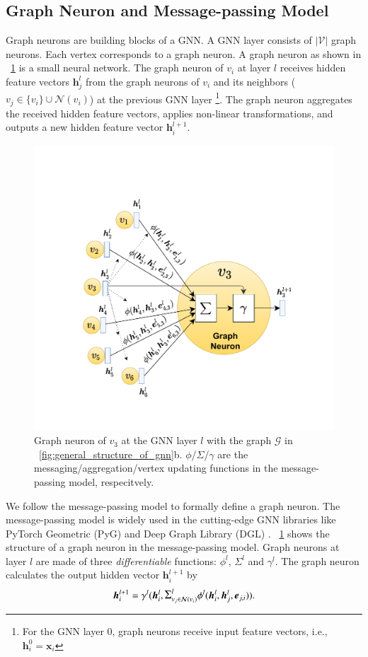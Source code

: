 \subsection{Graph Neuron and Message-passing Model}

Graph neurons are building blocks of a GNN.
A GNN layer consists of $|\mathcal{V}|$ graph neurons.
Each vertex corresponds to a graph neuron.
A graph neuron as shown in \figurename~\ref{fig:graph_neuron_structure} is a small neural network.
The graph neuron of $v_i$ at layer $l$ receives hidden feature vectors $\boldsymbol{h}^l_j$ from the graph neurons of $v_i$ and its neighbors ($v_j \in \{v_i\} \cup \mathcal{N}(v_i)$) at the previous GNN layer \footnote{For the GNN layer 0, graph neurons receive input feature vectors, i.e., $\boldsymbol{h}^0_i=\boldsymbol{x}_i$}.
The graph neuron aggregates the received hidden feature vectors, applies non-linear transformations, and outputs a new hidden feature vector $\boldsymbol{h}_i^{l+1}$.

\begin{figure}
    \centering
    \includegraphics[width=0.5\columnwidth]{figs/illustration/GNN_Unit.pdf}
    \caption{Graph neuron of $v_3$ at the GNN layer $l$ with the graph $\mathcal{G}$ in \figurename~\ref{fig:general_structure_of_gnn}b. $\phi$/$\Sigma$/$\gamma$ are the messaging/aggregation/vertex updating functions in the message-passing model, respecitvely.}
    \label{fig:graph_neuron_structure}
\end{figure}

We follow the message-passing model \cite{gilmer_messgae_passing} to formally define a graph neuron.
The message-passing model is widely used in the cutting-edge GNN libraries like PyTorch Geometric (PyG) \cite{PyG} and Deep Graph Library (DGL) \cite{DGL}.
\figurename~\ref{fig:graph_neuron_structure} shows the structure of a graph neuron in the message-passing model.
Graph neurons at layer $l$ are made of three \emph{differentiable} functions: $\phi^l$, $\Sigma^l$ and $\gamma^l$.
The graph neuron calculates the output hidden vector $\boldsymbol{h}^{l+1}_i$ by
$$
    \boldsymbol{h}^{l+1}_i = \gamma^l(\boldsymbol{h}^l_i, \mathlarger{\Sigma}^l_{v_j \in \mathcal{N}(v_i)}{\phi^l(\boldsymbol{h}^l_i, \boldsymbol{h}^l_j,   \boldsymbol{e}_{j,i})}).
$$


